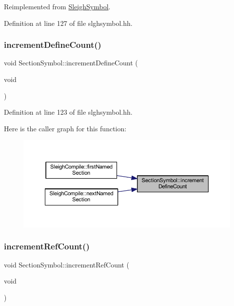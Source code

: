 Reimplemented from \mbox{\hyperlink{class_sleigh_symbol_a2f6e5903e461084c29f95ea024883950}{Sleigh\+Symbol}}.



Definition at line 127 of file slghsymbol.\+hh.

\mbox{\label{class_section_symbol_ab6186568cb2d9a9e5b4386657eef0fda}} 
\subsubsection{\texorpdfstring{incrementDefineCount()}{incrementDefineCount()}}
{\footnotesize\ttfamily void Section\+Symbol\+::increment\+Define\+Count (\begin{DoxyParamCaption}\item[{void}]{ }\end{DoxyParamCaption})\hspace{0.3cm}{\ttfamily [inline]}}



Definition at line 123 of file slghsymbol.\+hh.

Here is the caller graph for this function\+:
\nopagebreak
\begin{figure}[H]
\begin{center}
\leavevmode
\includegraphics[width=350pt]{class_section_symbol_ab6186568cb2d9a9e5b4386657eef0fda_icgraph}
\end{center}
\end{figure}
\mbox{\label{class_section_symbol_a5ea9f041ee89fea2d9d99fa80d10e914}} 
\subsubsection{\texorpdfstring{incrementRefCount()}{incrementRefCount()}}
{\footnotesize\ttfamily void Section\+Symbol\+::increment\+Ref\+Count (\begin{DoxyParamCaption}\item[{void}]{ }\end{DoxyParamCaption})\hspace{0.3cm}{\ttfamily [inline]}}




